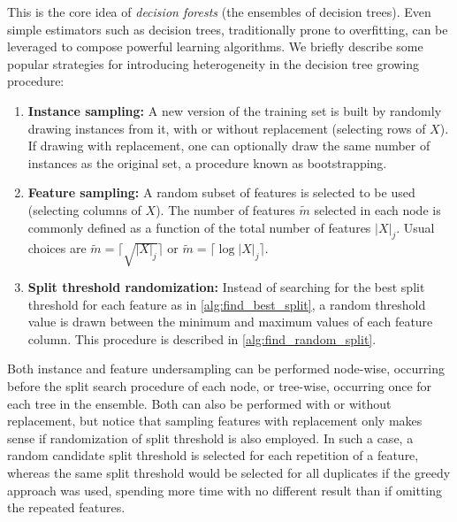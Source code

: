 This is the core idea of \emph{decision forests} (the ensembles of decision trees). Even simple estimators such as decision trees, traditionally prone to overfitting, can be leveraged to compose powerful learning algorithms.
%
We briefly describe some popular strategies for introducing heterogeneity in the decision tree growing procedure:

\begin{enumerate}  %
    \item \textbf{Instance sampling:} A new version of the training set is built by randomly drawing instances from it, with or without replacement (selecting rows of $X$). If drawing with replacement, one can optionally draw the same number of instances as the original set, a procedure known as bootstrapping.
    \item \textbf{Feature sampling:} A random subset of features is selected to be used (selecting columns of $X$). The number of features $\tilde m$ selected in each node is commonly defined as a function of the total number of features $|X|_j$. Usual choices are $\tilde m = \lceil \sqrt{|X|_j} \rceil$ or $\tilde m = \lceil \log |X|_j \rceil$.
    \item \textbf{Split threshold randomization:} Instead of searching for the best split threshold for each feature as in \autoref{alg:find_best_split}, a random threshold value is drawn between the minimum and maximum values of each feature column. This procedure is described in \autoref{alg:find_random_split}.  %
\end{enumerate}
%
Both instance and feature undersampling can be performed node-wise, occurring before the split search procedure of each node, or tree-wise, occurring once for each tree in the ensemble. Both can also be performed with or without replacement, but notice that sampling features with replacement only makes sense if randomization of split threshold is also employed. In such a case, a random candidate split threshold is selected for each repetition of a feature, whereas the same split threshold would be selected for all duplicates if the greedy approach was used, spending more time with no different result than if omitting the repeated features.

